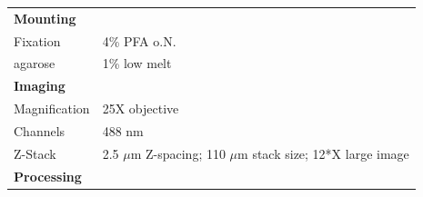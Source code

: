\documentclass[11pt,singlespacinge,twoside]{reedthesis} %
\begin{document}
\begin{longtable}[]{@{}ll@{}}
\begin{minipage}[t]{0.21\columnwidth}\raggedright
\textbf{Mounting}\strut
\end{minipage} & \begin{minipage}[t]{0.73\columnwidth}\raggedright
\strut
\end{minipage}\tabularnewline
\begin{minipage}[t]{0.21\columnwidth}\raggedright
Fixation\strut
\end{minipage} & \begin{minipage}[t]{0.73\columnwidth}\raggedright
4\% PFA o.N.\strut
\end{minipage}\tabularnewline
\begin{minipage}[t]{0.21\columnwidth}\raggedright
agarose\strut
\end{minipage} & \begin{minipage}[t]{0.73\columnwidth}\raggedright
1\% low melt\strut
\end{minipage}\tabularnewline
\begin{minipage}[t]{0.21\columnwidth}\raggedright
\textbf{Imaging}\strut
\end{minipage} & \begin{minipage}[t]{0.73\columnwidth}\raggedright
\strut
\end{minipage}\tabularnewline
\begin{minipage}[t]{0.21\columnwidth}\raggedright
Magnification\strut
\end{minipage} & \begin{minipage}[t]{0.73\columnwidth}\raggedright
25X objective\strut
\end{minipage}\tabularnewline
\begin{minipage}[t]{0.21\columnwidth}\raggedright
Channels\strut
\end{minipage} & \begin{minipage}[t]{0.73\columnwidth}\raggedright
488 nm\strut
\end{minipage}\tabularnewline
\begin{minipage}[t]{0.21\columnwidth}\raggedright
Z-Stack\strut
\end{minipage} & \begin{minipage}[t]{0.73\columnwidth}\raggedright
2.5 \(\mu\)m Z-spacing; 110 \(\mu\)m stack size; 12*X large image\strut
\end{minipage}\tabularnewline
\begin{minipage}[t]{0.21\columnwidth}\raggedright
\textbf{Processing}\strut
\end{minipage} & \begin{minipage}[t]{0.73\columnwidth}\raggedright

\end{minipage}
\end{longtable}
\end{document}

